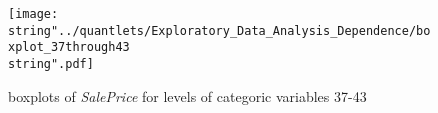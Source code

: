 \begin{figure}[H]
\centering
\begin{minipage}{.5\textwidth}
\centering
	\texttt{[image: \\string"../quantlets/Exploratory\_Data\_Analysis\_Dependence/boxplot\_37through43\\string".pdf]}
  	\caption{boxplots of \textit{SalePrice} for levels of categoric variables 37-43}
  	\label{fig:box37to43}
\end{minipage}
\end{figure}




